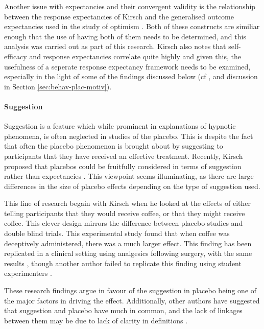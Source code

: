 Another issue with expectancies and their convergent validity is the relationship between the response expectancies of Kirsch  and the generalised outcome expectancies used in the study of optimism \cite{Carver2010}. Both of these constructs are similiar enough that the use of having both of them needs to be determined, and this analysis was carried out as part of this research. Kirsch also notes that self-efficacy \cite{Bandura1977} and response expectancies correlate quite highly \cite{Kirsch1985} and given this, the usefulness of a seperate response expectancy framework needs to be examined, especially in the light of some of the findings discussed below (cf \cite{Geers2005} \cite{Hyland2007}, and discussion in Section \ref{sec:behav-plac-motiv}). 

\paragraph{Suggestion} 
\label{sec:suggestion}

Suggestion is a feature which while prominent in explanations of hypnotic phenomena, is often neglected in studies of the placebo. This is despite the fact that often the placebo phenomenon is brought about by suggesting to participants that they have received an effective treatment. Recently, Kirsch proposed that  placebos could be fruitfully considered in terms of suggestion rather than expectancies  \cite{Kirsch1999}. This viewpoint seems illuminating, as there are large differences in the size of placebo effects depending on the type of suggestion used. 

This line of research begain with Kirsch \cite{kirsch1988double} when he looked at the effects of either telling participants that they would receive coffee, or that they might receive coffee. This clever design  mirrors the difference between placebo studies and double blind trials. This experimental study found that when coffee was deceptively administered, there was a much larger effect. This finding has been replicated in a clinical setting using analgesics following surgery, with the same results \cite{Amanzio2001}, though another author failed to replicate this finding using student experimenters \cite{Walach2002}. 

 These research findings argue in favour of the suggestion in placebo being one of the major factors in driving the effect. Additionally, other authors have suggested that suggestion and placebo have much in common, and the lack of linkages between them may be due to lack of clarity in definitions \cite{DePascalis2002}. 

